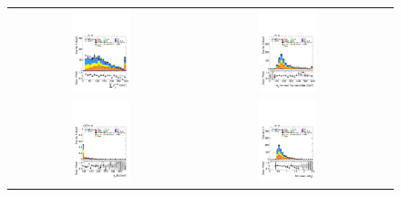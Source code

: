 \begin{figure}[htbp]
\begin{tabular}{@{}c c c@{}}
      \includegraphics[width=0.33\textwidth]{images/modelling_tmva_vars/plot_SumPtBjet_hh_tth.pdf} &
      \includegraphics[width=0.33\textwidth]{images/modelling_tmva_vars/plot_mTopWbest_hh_tth.pdf} \\[4pt]
      \includegraphics[width=0.33\textwidth]{images/modelling_tmva_vars/plot_ditau_pt_hh_tth.pdf} &
      \includegraphics[width=0.33\textwidth]{images/modelling_tmva_vars/plot_jjdrmin_hh_tth.pdf} &

\end{tabular}
\end{figure}
